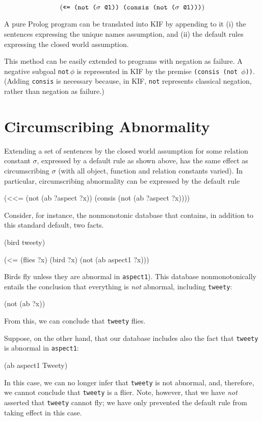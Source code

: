 $$(\hbox{\tt <<= (not ($\sigma$ @l)) (consis (not ($\sigma$ @l)))})$$

A pure Prolog program can be translated into KIF by appending to it (i) the
sentences expressing the unique names assumption, and (ii) the default rules
expressing the closed world assumption.

This method can be easily extended to programs with negation as failure.
A negative subgoal {\tt not}$\,\phi$ is represented in KIF by the premise
{\tt (consis (not $\phi$))}. (Adding {\tt consis} is necessary because,
in KIF, {\tt not} represents classical negation, rather than negation as
failure.)

\section{Circumscribing Abnormality}

Extending a set of sentences by the closed world assumption for some relation
constant $\sigma$, expressed by a default rule as shown above,
has the same effect as circumscribing $\sigma$ (with all object, function
and relation constants varied).  In particular, circumscribing
abnormality can be expressed by the default rule

\medskip
\beginverbatim
(<<= (not (ab ?aspect ?x)) (consis (not (ab ?aspect ?x))))
\endverbatim
\medskip

Consider, for instance, the nonmonotonic database that contains, in addition
to this standard default, two facts.

\medskip
\beginverbatim
(bird tweety)

(<= (flies ?x) (bird ?x) (not (ab aspect1 ?x)))
\endverbatim
\medskip

Birds fly unless they are abnormal in {\tt aspect1}).
This database nonmonotonically entails the conclusion
that everything is {\it not} abnormal, including {\tt tweety}:

\medskip
\beginverbatim
(not (ab ?x))
\endverbatim
\medskip

From this, we can conclude that {\tt tweety} flies.

Suppose, on the other hand, that our database includes also the fact
that {\tt tweety} is abnormal in {\tt aspect1}:

\medskip
\beginverbatim
(ab aspect1 Tweety)
\endverbatim
\medskip

In this case, we can no longer infer that {\tt tweety} is not abnormal, and,
therefore, we cannot conclude that {\tt tweety} is a flier.  Note, however,
that we have {\it not} asserted that {\tt tweety} cannot fly; we have only
prevented the default rule from taking effect in this case.

